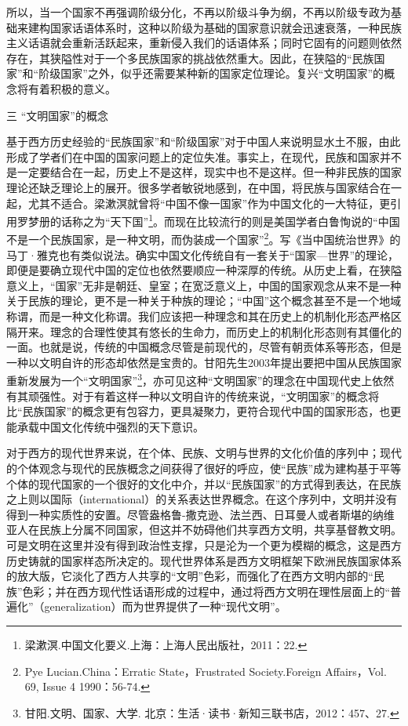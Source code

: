 \documentclass[UTF8, 12pt, a4paper]{ctexrep}
\begin{document}
所以，当一个国家不再强调阶级分化，不再以阶级斗争为纲，不再以阶级专政为基础来建构国家话语体系时，这种以阶级为基础的国家意识就会迅速衰落，一种民族主义话语就会重新活跃起来，重新侵入我们的话语体系；同时它固有的问题则依然存在，其狭隘性对于一个多民族国家的挑战依然重大。因此，在狭隘的“民族国家”和“阶级国家”之外，似乎还需要某种新的国家定位理论。复兴“文明国家”的概念将有着积极的意义。

三 “文明国家”的概念

基于西方历史经验的“民族国家”和“阶级国家”对于中国人来说明显水土不服，由此形成了学者们在中国的国家问题上的定位失准。事实上，在现代，民族和国家并不是一定要结合在一起，历史上不是这样，现实中也不是这样。但一种非民族的国家理论还缺乏理论上的展开。很多学者敏锐地感到，在中国，将民族与国家结合在一起，尤其不适合。梁漱溟就曾将“中国不像一国家”作为中国文化的一大特征，更引用罗梦册的话称之为“天下国”\footnote{梁漱溟.中国文化要义.上海：上海人民出版社，2011：22.}。而现在比较流行的则是美国学者白鲁恂说的“中国不是一个民族国家，是一种文明，而伪装成一个国家”\footnote{Pye Lucian.China：Erratic State，Frustrated Society.Foreign Affairs，Vol. 69, Issue 4 1990：56-74.}。写《当中国统治世界》的马丁·雅克也有类似说法。确实中国文化传统自有一套关于“国家—世界”的理论，即便是要确立现代中国的定位也依然要顺应一种深厚的传统。从历史上看，在狭隘意义上，“国家”无非是朝廷、皇室；在宽泛意义上，中国的国家观念从来不是一种关于民族的理论，更不是一种关于种族的理论；“中国”这个概念甚至不是一个地域称谓，而是一种文化称谓。我们应该把一种理念和其在历史上的机制化形态严格区隔开来。理念的合理性使其有悠长的生命力，而历史上的机制化形态则有其僵化的一面。也就是说，传统的中国概念尽管是前现代的，尽管有朝贡体系等形态，但是一种以文明自许的形态却依然是宝贵的。甘阳先生2003年提出要把中国从民族国家重新发展为一个“文明国家”\footnote{甘阳.文明、国家、大学. 北京：生活·读书·新知三联书店，2012：457、27.}，亦可见这种“文明国家”的理念在中国现代史上依然有其顽强性。对于有着这样一种以文明自许的传统来说，“文明国家”的概念将比“民族国家”的概念更有包容力，更具凝聚力，更符合现代中国的国家形态，也更能承载中国文化传统中强烈的天下意识。

对于西方的现代世界来说，在个体、民族、文明与世界的文化价值的序列中；现代的个体观念与现代的民族概念之间获得了很好的呼应，使“民族”成为建构基于平等个体的现代国家的一个很好的文化中介，并以“民族国家”的方式得到表达，在民族之上则以国际（international）的关系表达世界概念。在这个序列中，文明并没有得到一种实质性的安置。尽管盎格鲁-撒克逊、法兰西、日耳曼人或者斯堪的纳维亚人在民族上分属不同国家，但这并不妨碍他们共享西方文明，共享基督教文明。可是文明在这里并没有得到政治性支撑，只是沦为一个更为模糊的概念，这是西方历史铸就的国家样态所决定的。现代世界体系是西方文明框架下欧洲民族国家体系的放大版，它淡化了西方人共享的“文明”色彩，而强化了在西方文明内部的“民族”色彩；并在西方现代性话语形成的过程中，通过将西方文明在理性层面上的“普遍化”（generalization）而为世界提供了一种“现代文明”。
\end{document}
